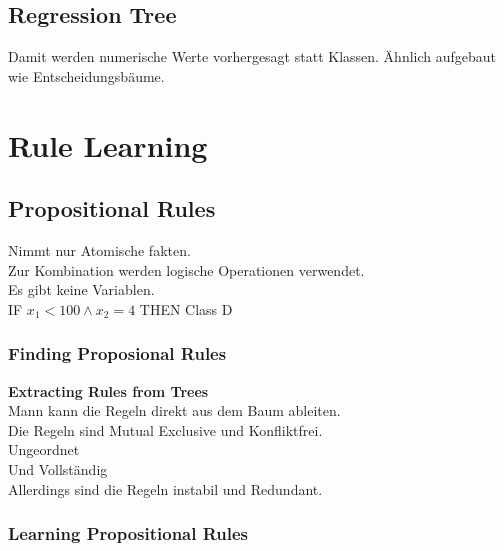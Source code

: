 \documentclass[a4paper]{scrartcl}
\begin{document}
 \subsection{Regression Tree}
 Damit werden numerische Werte vorhergesagt statt Klassen.
 Ähnlich aufgebaut wie Entscheidungsbäume.
 
 \section{Rule Learning}
 \subsection{Propositional Rules}
 Nimmt nur Atomische fakten.\\
 Zur Kombination werden logische Operationen verwendet.\\
 Es gibt keine Variablen.\\
 
 IF $x_1 < 100 \wedge x_2 = 4$ THEN Class D\\
 \subsubsection{Finding Proposional Rules}
 \textbf{Extracting Rules from Trees}\\
 Mann kann die Regeln direkt aus dem Baum ableiten.\\
 Die Regeln sind Mutual Exclusive und Konfliktfrei.\\
 Ungeordnet\\
 Und Vollständig\\
 Allerdings sind die Regeln instabil und Redundant.\\
 
 \subsubsection{Learning Propositional Rules}
 
\end{document}
